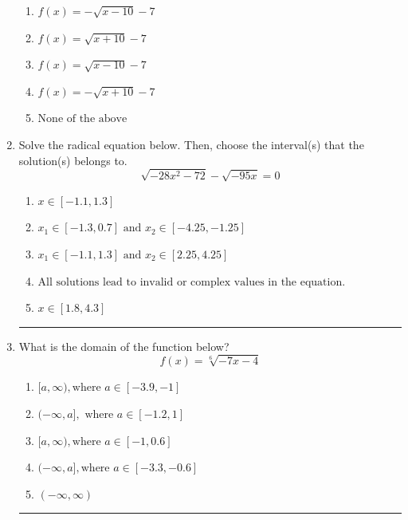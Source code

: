 \documentclass[14pt]{extbook}
\newcommand{\litem}[1]{\item#1\hspace*{-1cm}\rule{\textwidth}{0.4pt}}
\begin{document}
\begin{enumerate}
{\begin{center}
\end{center}
\begin{enumerate}[label=\Alph*.]
\item \( f(x) = - \sqrt{x - 10} - 7 \)
\item \( f(x) = \sqrt{x + 10} - 7 \)
\item \( f(x) = \sqrt{x - 10} - 7 \)
\item \( f(x) = - \sqrt{x + 10} - 7 \)
\item \( \text{None of the above} \)

\end{enumerate} }
\litem{
Solve the radical equation below. Then, choose the interval(s) that the solution(s) belongs to.\[ \sqrt{-28 x^2 - 72} - \sqrt{-95 x} = 0 \]\begin{enumerate}[label=\Alph*.]
\item \( x \in [-1.1,1.3] \)
\item \( x_1 \in [-1.3, 0.7] \text{ and } x_2 \in [-4.25,-1.25] \)
\item \( x_1 \in [-1.1, 1.3] \text{ and } x_2 \in [2.25,4.25] \)
\item \( \text{All solutions lead to invalid or complex values in the equation.} \)
\item \( x \in [1.8,4.3] \)

\end{enumerate} }
\litem{
What is the domain of the function below?\[ f(x) = \sqrt[6]{-7 x - 4} \]\begin{enumerate}[label=\Alph*.]
\item \( [a, \infty), \text{where } a \in [-3.9, -1] \)
\item \( (-\infty, a], \text{ where } a \in [-1.2, 1] \)
\item \( [a, \infty), \text{where } a \in [-1, 0.6] \)
\item \( (-\infty, a], \text{where } a \in [-3.3, -0.6] \)
\item \( (-\infty, \infty) \)


\end{enumerate}}
\end{enumerate}
\end{document}
